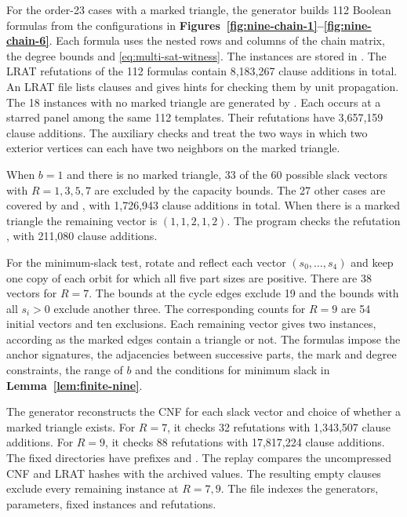 \documentclass[preprint,11pt,numbers]{elsarticle-arxiv}
\numberwithin{equation}{section}
\theoremstyle{definition}
\begin{document}
For the order-23 cases with a marked triangle, the generator
 builds 112 Boolean formulas from
the configurations in \textbf{Figures~\ref{fig:nine-chain-1}--\ref{fig:nine-chain-6}}.
Each formula uses the nested rows and columns of the chain matrix,
the degree bounds and \eqref{eq:multi-sat-witness}. The instances
are stored in .
The LRAT refutations of the 112 formulas contain 8,183,267 clause
additions in total. An LRAT file lists clauses and
gives hints for checking them by unit propagation. The 18 instances
with no marked triangle are generated by .
Each occurs at a starred panel among the same 112 templates. Their
refutations have 3,657,159 clause additions. The auxiliary
checks  and  treat the two ways
in which two exterior vertices can each have two neighbors on the
marked triangle.

When $b=1$ and there is no marked triangle, 33 of the 60 possible
slack vectors with $R=1,3,5,7$ are excluded by the capacity bounds.
The 27 other cases are covered by  and
, with 1,726,943 clause additions in total.
When there is a marked triangle the remaining vector is $(1,1,2,1,2)$.
The program  checks the refutation
, with 211,080 clause additions.

For the minimum-slack test, rotate and reflect each vector
$(s_0,\ldots,s_4)$ and keep one copy of each orbit for which all five
part sizes are positive. There are 38 vectors for $R=7$. The bounds
at the cycle edges exclude 19 and the bounds with all $s_i>0$
exclude another three. The corresponding counts for $R=9$ are 54
initial vectors and ten exclusions. Each remaining vector gives two
instances, according as the marked edges contain a triangle or not.
The formulas impose the anchor signatures, the adjacencies between
successive parts, the mark and degree constraints, the range of
$b$ and the conditions for minimum slack in \textbf{Lemma~\ref{lem:finite-nine}}.

The generator  reconstructs the CNF
for each slack vector and choice of whether a marked
triangle exists. For $R=7$, it checks 32 refutations with
1,343,507 clause additions. For $R=9$, it checks 88
refutations with 17,817,224 clause additions. The fixed
directories have prefixes 
and . The replay compares the
uncompressed CNF and LRAT hashes with the archived
values.
The resulting empty clauses exclude every remaining instance at $R=7,9$.
The file  indexes the
generators, parameters, fixed instances and refutations.
\relax\space%
\end{document}
